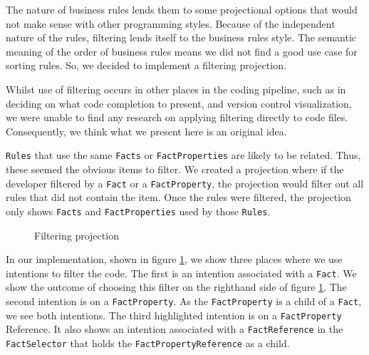 The nature of business rules lends them to some projectional options that would not make sense with other programming styles.
Because of the independent nature of the rules, filtering lends itself to the business rules style.
The semantic meaning of the order of business rules means we did not find a good use case for sorting rules.
So, we decided to implement a filtering projection.

Whilst use of filtering occurs in other places in the coding pipeline, such as in deciding on what code completion to present\cite{hou2010towards}, and version control visualization\cite{yoon2013visualization}, we were unable to find any research on applying filtering directly to code files.
Consequently, we think what we present here is an original idea.

\texttt{Rules} that use the same \texttt{Facts} or \texttt{FactProperties} are likely to be related.
Thus, these seemed the obvious items to filter.
We created a projection where if the developer filtered by a \texttt{Fact} or a \texttt{FactProperty}, the projection would filter out all rules that did not contain the item.
Once the rules were filtered, the projection only shows \texttt{Facts} and \texttt{FactProperties} used by those \texttt{Rules}.

\begin{figure}[h]
    \centering
    \caption{Filtering projection}
    \label{fig:filteringProjection}
\end{figure}

In our implementation, shown in figure \ref{fig:filteringProjection}, we show three places where we use intentions to filter the code.
The first is an intention associated with a \texttt{Fact}.
We show the outcome of choosing this filter on the righthand side of figure \ref{fig:filteringProjection}.
The second intention is on a \texttt{FactProperty}.
As the \texttt{FactProperty} is a child of a \texttt{Fact}, we see both intentions.
The third highlighted intention is on a \texttt{FactProperty} Reference.
It also shows an intention associated with a \texttt{FactReference} in the \texttt{FactSelector} that holds the \texttt{FactPropertyReference} as a child.

